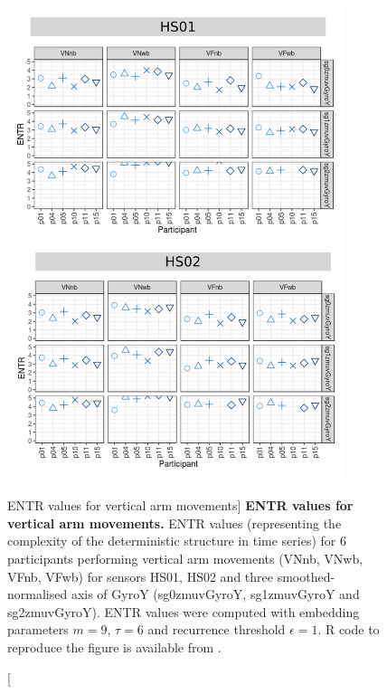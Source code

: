 \begin{figure}
\centering
\includegraphics[width=0.88\textwidth]{rqa_entr_V_w500}
    \caption
	[ENTR values for vertical arm movements]{
	{\bf ENTR values for vertical arm movements.}	
	ENTR values (representing the complexity of the deterministic 
	structure in time series) for 
	6 participants performing vertical arm movements (VNnb, VNwb, VFnb, VFwb)
	for sensors HS01, HS02 and three smoothed-normalised axis 
	of GyroY (sg0zmuvGyroY, sg1zmuvGyroY and sg2zmuvGyroY).
	ENTR values were computed with 
	embedding parameters $m=9$, $\tau=6$ and recurrence threshold
	$\epsilon=1$.
	R code to reproduce the figure is available from \cite{xochicale2018}.
        }
    \label{fig:rqa_entr_V}
\end{figure}





